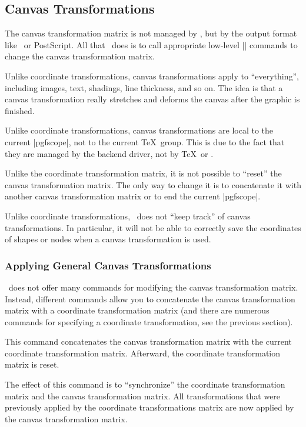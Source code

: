 \subsection{Canvas Transformations}

The canvas transformation matrix is not managed by \pgfname, but by the output
format like \pdf\ or PostScript. All that \pgfname\ does is to call appropriate
low-level |\pgfsys@| commands to change the canvas transformation matrix.

Unlike coordinate transformations, canvas transformations apply to
``everything'', including images, text, shadings, line thickness, and so on.
The idea is that a canvas transformation really stretches and deforms the
canvas after the graphic is finished.

Unlike coordinate transformations, canvas transformations are local to the
current |{pgfscope}|, not to the current \TeX\ group. This is due to the fact
that they are managed by the backend driver, not by \TeX\ or \pgfname.

Unlike the coordinate transformation matrix, it is not possible to ``reset''
the canvas transformation matrix. The only way to change it is to concatenate
it with another canvas transformation matrix or to end the current
|{pgfscope}|.

Unlike coordinate transformations, \pgfname\ does not ``keep track'' of canvas
transformations. In particular, it will not be able to correctly save the
coordinates of shapes or nodes when a canvas transformation is used.


\subsubsection{Applying General Canvas Transformations}

\pgfname\ does not offer many commands for modifying the canvas transformation
matrix. Instead, different commands allow you to concatenate the canvas
transformation matrix with a coordinate transformation matrix (and there are
numerous commands for specifying a coordinate transformation, see the previous
section).

\begin{command}{\pgflowlevelsynccm}
    This command concatenates the canvas transformation matrix with the current
    coordinate transformation matrix. Afterward, the coordinate transformation
    matrix is reset.

    The effect of this command is to ``synchronize'' the coordinate
    transformation matrix and the canvas transformation matrix. All
    transformations that were previously applied by the coordinate
    transformations matrix are now applied by the canvas transformation matrix.
\begin{codeexample}[]
\end{codeexample}
\end{command}

